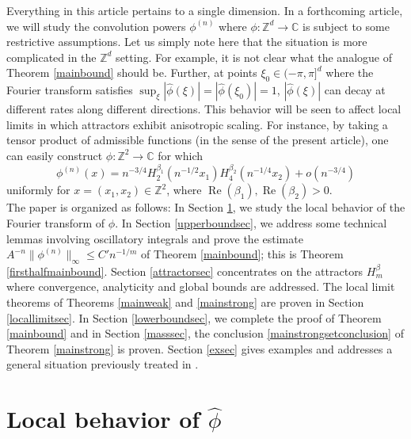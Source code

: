 \documentclass{article}
\theoremstyle{theorem}
\theoremstyle{remark}
\renewcommand\Re{\operatorname{Re}}%
\begin{document}
\noindent Everything in this article pertains to a single dimension. In a forthcoming article, we will study the convolution powers $\phi^{(n)}$ where $\phi:\mathbb{Z}^d\rightarrow \mathbb{C}$ is subject to some restrictive assumptions. Let us simply note here that the situation is more complicated in the $\mathbb{Z}^d$ setting. For example, it is not clear what the analogue of Theorem \ref{mainbound} should be. Further, at points $\xi_0\in(-\pi,\pi]^d$ where the Fourier transform satisfies $\sup_{\xi}|\hat\phi(\xi)|=|\hat\phi(\xi_0)|=1$, $|\hat\phi(\xi)|$ can decay at different rates along different directions. This behavior will be seen to affect local limits in which attractors exhibit anisotropic scaling. For instance, by taking a tensor product of admissible functions (in the sense of the present article), one can easily construct $\phi:\mathbb{Z}^2\rightarrow \mathbb{C}$ for which
\begin{equation*}
\phi^{(n)}(x)=n^{-3/4}H_2^{\beta_1}(n^{-1/2}x_1)H_4^{\beta_2}(n^{-1/4}x_2)+o(n^{-3/4})
\end{equation*}
uniformly for $x=(x_1,x_2)\in\mathbb{Z}^2$, where $\Re(\beta_1),\Re(\beta_2)>0$.\\

 
\noindent The paper is organized as follows: In Section \ref{localphisec}, we study the local
behavior of the Fourier transform of $\phi$. In Section \ref{upperboundsec}, we address some technical lemmas involving oscillatory integrals and prove the estimate $A^{-n}\|\phi^{(n)}\|_\infty\leq C'n^{-1/m}$ of Theorem \ref{mainbound}; this is Theorem \ref{firsthalfmainbound}. Section \ref{attractorsec} concentrates on the attractors $H_m^{\beta}$ where convergence, analyticity and global bounds are addressed. The local limit theorems of Theorems \ref{mainweak} and \ref{mainstrong}
are proven in Section \ref{locallimitsec}. In Section \ref{lowerboundsec}, we complete the proof of Theorem
\ref{mainbound} and in Section \ref{masssec}, the conclusion \eqref{mainstrongsetconclusion} of Theorem \ref{mainstrong}
is proven. Section \ref{exsec} gives examples and addresses a general situation previously treated in \cite{DSC1}.


\section{Local behavior of $\hat{\phi}$}\label{localphisec}
\end{document}
